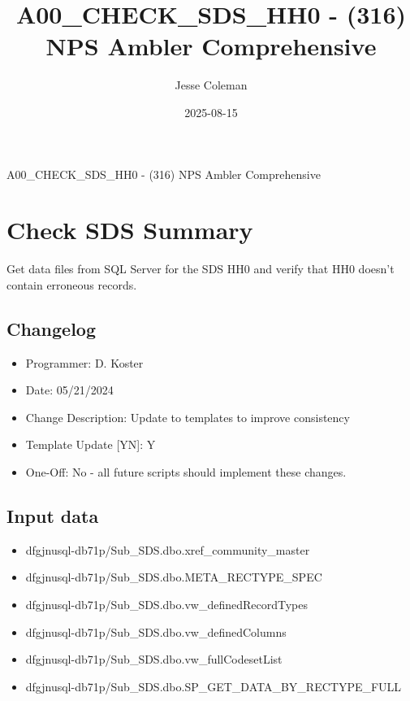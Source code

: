 \documentclass[
]{article}
\title{A00\_CHECK\_SDS\_HH0 - (316) NPS Ambler Comprehensive}
\author{Jesse Coleman}
\date{2025-08-15}
\providecommand{\tightlist}{%
  \setlength{\itemsep}{0pt}\setlength{\parskip}{0pt}}
\begin{document}
\maketitle

A00\_CHECK\_SDS\_HH0 - (316) NPS Ambler Comprehensive

\section{Check SDS Summary}\label{check-sds-summary}

Get data files from SQL Server for the SDS HH0 and verify that HH0
doesn't contain erroneous records.

\subsection{Changelog}\label{changelog}

\begin{itemize}
\tightlist
\item
  Programmer: D. Koster\\
\item
  Date: 05/21/2024
\item
  Change Description: Update to templates to improve consistency\\
\item
  Template Update {[}Y\textbar N{]}: Y\\
\item
  One-Off: No - all future scripts should implement these changes.
\end{itemize}

\subsection{Input data}\label{input-data}

\begin{itemize}
\tightlist
\item
  dfgjnusql-db71p/Sub\_SDS.dbo.xref\_community\_master\\
\item
  dfgjnusql-db71p/Sub\_SDS.dbo.META\_RECTYPE\_SPEC\\
\item
  dfgjnusql-db71p/Sub\_SDS.dbo.vw\_definedRecordTypes\\
\item
  dfgjnusql-db71p/Sub\_SDS.dbo.vw\_definedColumns\\
\item
  dfgjnusql-db71p/Sub\_SDS.dbo.vw\_fullCodesetList\\
\item
  dfgjnusql-db71p/Sub\_SDS.dbo.SP\_GET\_DATA\_BY\_RECTYPE\_FULL
\end{itemize}
\end{document}
